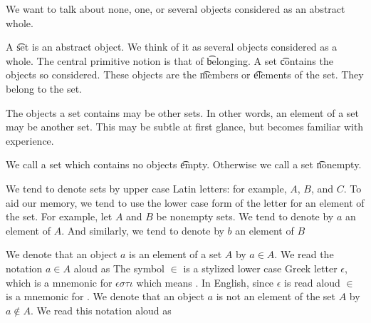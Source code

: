 
We want to talk about none, one, or several objects considered as an abstract whole.


A \t{set} is an abstract object.
We think of it as several objects considered as a whole.
The central primitive notion is that of \t{belonging}.
A set \t{contains} the objects so considered.
These objects are the \t{members} or \t{elements} of the set.
They belong to the set.

The objects a set contains may be other sets.
In other words, an element of a set may be another set.
This may be subtle at first glance, but becomes familiar with experience.

We call a set which contains no objects \t{empty}.
Otherwise we call a set \t{nonempty}.

We tend to denote sets by upper case Latin letters: for example, $A$, $B$, and $C$.
To aid our memory, we tend to use the lower case form of the letter for an element of the set.
For example, let $A$ and $B$ be nonempty sets.
We tend to denote by $a$ an element of $A$. And similarly, we tend to denote by $b$ an element of $B$

We denote that an object $a$ is an element of a set $A$ by $a \in A$.
We read the notation $a \in A$ aloud as 
The symbol $\in$ is a stylized lower case Greek letter $\epsilon$, which is a mnemonic for $\epsilon \sigma \tau \iota$ which means .
In English, since $\epsilon$ is read aloud  $\in$ is a mnemonic for .
We denote that an object $a$ is not an element of the set $A$ by $a \not\in A$.
We read this notation aloud as 
%
%


